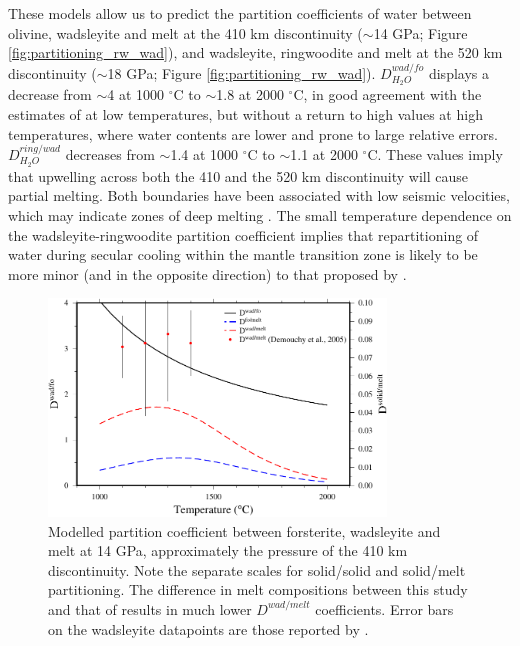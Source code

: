 \documentclass[review]{elsarticle}
\begin{document}
These models allow us to predict the partition coefficients of water between olivine, wadsleyite and melt at the 410 km discontinuity ($\sim$14 GPa; Figure \ref{fig:partitioning_rw_wad}), and wadsleyite, ringwoodite and melt at the 520 km discontinuity ($\sim$18 GPa; Figure \ref{fig:partitioning_rw_wad}). $D^{wad/fo}_{H_2O}$ displays a decrease from $\sim$4 at 1000 $^{\circ}$C to $\sim$1.8 at 2000 $^{\circ}$C, in good agreement with the estimates of \cite{LSOK2011} at low temperatures, but without a return to high values at high temperatures, where water contents are lower and prone to large relative errors. $D^{ring/wad}_{H_2O}$ decreases from $\sim$1.4 at 1000 $^{\circ}$C to $\sim$1.1 at 2000 $^{\circ}$C. These values imply that upwelling across both the 410 and the 520 km discontinuity will cause partial melting. Both boundaries have been associated with low seismic velocities, which may indicate zones of deep melting \citep[e.g.][]{JDH2010}. The small temperature dependence on the wadsleyite-ringwoodite partition coefficient implies that repartitioning of water during secular cooling within the mantle transition zone is likely to be more minor (and in the opposite direction) to that proposed by \cite{DDFK2005}. 

\begin{figure}[ht!]
  \centering
  \includegraphics[width=0.8\textwidth]{figures/wad_fo_partitioning_410}
  \caption{Modelled partition coefficient between forsterite, wadsleyite and melt at 14 GPa, approximately the pressure of the 410 km discontinuity. Note the separate scales for solid/solid and solid/melt partitioning. The difference in melt compositions between this study and that of \cite{DDFK2005} results in much lower $D^{wad/melt}$ coefficients. Error bars on the wadsleyite datapoints are those reported by \cite{DDFK2005}.}
  \label{fig:partitioning_wad_fo}
\end{figure}
\end{document}
